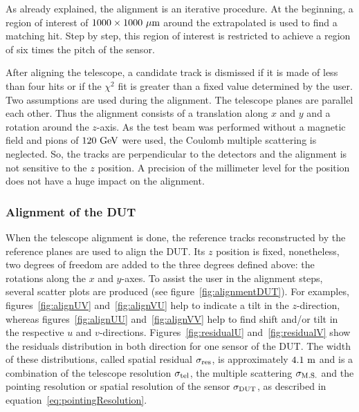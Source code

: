       As already explained, the alignment is an iterative procedure.
      At the beginning, a region of interest of $1000 \times 1000~\rm{\mu m}$ around the extrapolated is used to find a matching hit.
      Step by step, this region of interest is restricted to achieve a region of six times the pitch of the sensor.
      
      After aligning the telescope, a candidate track is dismissed if it is made of less than four hits or if the $\chi^2$ fit is greater than a fixed value determined by the user. 
      Two assumptions are used during the alignment. 
      The telescope planes are parallel each other.
      Thus the alignment consists of a translation along $x$ and $y$ and a rotation around the $z$-axis.
      As the test beam was performed without a magnetic field and pions of $120~\rm{GeV}$ were used, the Coulomb multiple scattering is neglected.
      So, the tracks are perpendicular to the detectors and the alignment is not sensitive to the $z$ position.
      A precision of the millimeter level for the position does not have a huge impact on the alignment.

      \subsubsection{Alignment of the DUT}

      When the telescope alignment is done, the reference tracks reconstructed by the reference planes are used to align the \gls{DUT}.
      Its $z$ position is fixed, nonetheless, two degrees of freedom are added to the three degrees defined above: the rotations along the $x$ and $y$-axes.
      To assist the user in the alignment steps, several scatter plots are produced (see figure~\ref{fig:alignmentDUT}).
      For examples, figures~\ref{fig:alignUV} and~\ref{fig:alignVU} help to indicate a tilt in the $z$-direction, whereas figures~\ref{fig:alignUU} and~\ref{fig:alignVV} help to find shift and/or tilt in the respective $u$ and $v$-directions.
      Figures~\ref{fig:residualU} and~\ref{fig:residualV} show the residuals distribution in both direction for one sensor of the \gls{DUT}.
      The width of these distributions, called spatial residual $\sigma_{\rm{res}}$, is approximately $4.1~\rm{m}$ and is a combination of the telescope resolution $\sigma_{\rm{tel}}$, the multiple scattering $\sigma_{\rm{M.S.}}$ and the pointing resolution or spatial resolution of the sensor $\sigma_{\rm{DUT}}$, as described in equation~\ref{eq:pointingResolution}.
      
